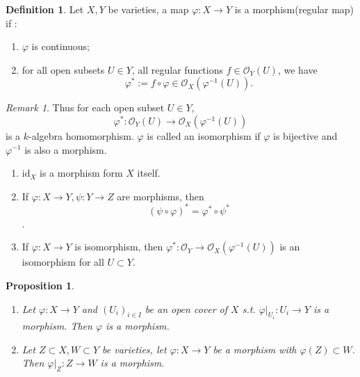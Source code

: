 \documentclass{amsart}
\theoremstyle{plain}
\newtheorem{proposition}{Proposition}
\theoremstyle{definition}
\newtheorem{definition}{Definition}
\theoremstyle{remark}
\newtheorem*{remark}{Remark}
\numberwithin{equation}{section}
\begin{document}
\begin{definition}\label{11}
	Let $ X,Y $ be varieties, a map $ \varphi :X\to Y $ is a morphism(regular map) if :\begin{enumerate}
		\item $ \varphi $ is continuous;
		\item for all open subsets $ U\in Y $, all regular functions $ f\in \mathcal{O}_Y(U) $, we have
		$$
		\varphi^\ast := f\circ \varphi \in \mathcal{O}_X(\varphi^{-1}(U)).
		$$
	\end{enumerate}
\end{definition}
\begin{remark}
			Thus for each open subset $ U\in Y $,
			$$
			\varphi^\ast :\mathcal{O}_Y(U)\to \mathcal{O}_X(\varphi^{-1}(U))
			$$
			is a $ k $-algebra homomorphism. $ \varphi $ is called an isomorphism if $ \varphi $ is bijective and $ \varphi^{-1} $ is also a morphism.
				\begin{enumerate}
					\item $ \text{id}_X $ is a morphism form $ X $ itself.
					\item If $ \varphi:X\to Y,\psi :Y\to Z $ are morphisms, then
					$$
					(\psi\circ\varphi)^\ast = \varphi^\ast \circ \psi^\ast
					$$.
					\item If $ \varphi : X\to Y $ is isomorphism, then $ \varphi^\ast: \mathcal{O}_Y\to \mathcal{O}_X(\varphi^{-1}(U)) $ is an  isomorphism for all $ U\subset Y $.
 				\end{enumerate}
\end{remark}
\begin{proposition}
	\begin{enumerate}
		\item Let $ \varphi :X\to Y $ and $ (U_i)_{i\in I} $ be an open cover of $ X $ s.t. $ \varphi |_{U_i}:U_i\to Y $ is a morphism. Then $ \varphi  $ is a morphism.
		\item Let $ Z\subset X, W\subset Y $ be varieties, let $ \varphi:X\to Y $ be a morphism with $ \varphi(Z)\subset W $. Then $ \varphi|_Z:Z\to W $ is a morphism.
	\end{enumerate}
\end{proposition}
\end{document}
